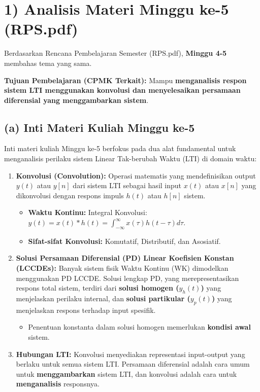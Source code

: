 \documentclass[
  letterpaper,
  DIV=11,
  numbers=noendperiod]{scrreprt}
\providecommand{\tightlist}{%
  \setlength{\itemsep}{0pt}\setlength{\parskip}{0pt}}
\begin{document}

\chapter{1) Analisis Materi Minggu ke-5
(RPS.pdf)}\label{analisis-materi-minggu-ke-5-rps.pdf}

Berdasarkan Rencana Pembelajaran Semester (RPS.pdf), \textbf{Minggu 4-5}
membahas tema yang sama.

\textbf{Tujuan Pembelajaran (CPMK Terkait):} Mampu \textbf{menganalisis
respon sistem LTI menggunakan konvolusi dan menyelesaikan persamaan
diferensial yang menggambarkan sistem}.

\section{(a) Inti Materi Kuliah Minggu
ke-5}\label{a-inti-materi-kuliah-minggu-ke-5}

Inti materi kuliah Minggu ke-5 berfokus pada dua alat fundamental untuk
menganalisis perilaku sistem Linear Tak-berubah Waktu (LTI) di domain
waktu:

\begin{enumerate}
\def\labelenumi{\arabic{enumi}.}
\tightlist
\item
  \textbf{Konvolusi (Convolution):} Operasi matematis yang
  mendefinisikan output \(y(t)\) atau \(y[n]\) dari sistem LTI sebagai
  hasil input \(x(t)\) atau \(x[n]\) yang dikonvolusi dengan respons
  impuls \(h(t)\) atau \(h[n]\) sistem.

  \begin{itemize}
  \tightlist
  \item
    \textbf{Waktu Kontinu:} Integral Konvolusi:
    \(y(t) = x(t) * h(t) = \int_{-\infty}^{\infty} x(\tau)h(t-\tau)d\tau\).
  \item
    \textbf{Sifat-sifat Konvolusi:} Komutatif, Distributif, dan
    Asosiatif.
  \end{itemize}
\item
  \textbf{Solusi Persamaan Diferensial (PD) Linear Koefisien Konstan
  (LCCDEs):} Banyak sistem fisik Waktu Kontinu (WK) dimodelkan
  menggunakan PD LCCDE. Solusi lengkap PD, yang merepresentasikan
  respons total sistem, terdiri dari \textbf{solusi homogen
  (\(y_h(t)\))} yang menjelaskan perilaku internal, dan \textbf{solusi
  partikular (\(y_p(t)\))} yang menjelaskan respons terhadap input
  spesifik.

  \begin{itemize}
  \tightlist
  \item
    Penentuan konstanta dalam solusi homogen memerlukan \textbf{kondisi
    awal} sistem.
  \end{itemize}
\item
  \textbf{Hubungan LTI:} Konvolusi menyediakan representasi input-output
  yang berlaku untuk semua sistem LTI. Persamaan diferensial adalah cara
  umum untuk \textbf{menggambarkan} sistem LTI, dan konvolusi adalah
  cara untuk \textbf{menganalisis} responsnya.
\end{enumerate}
\end{document}
